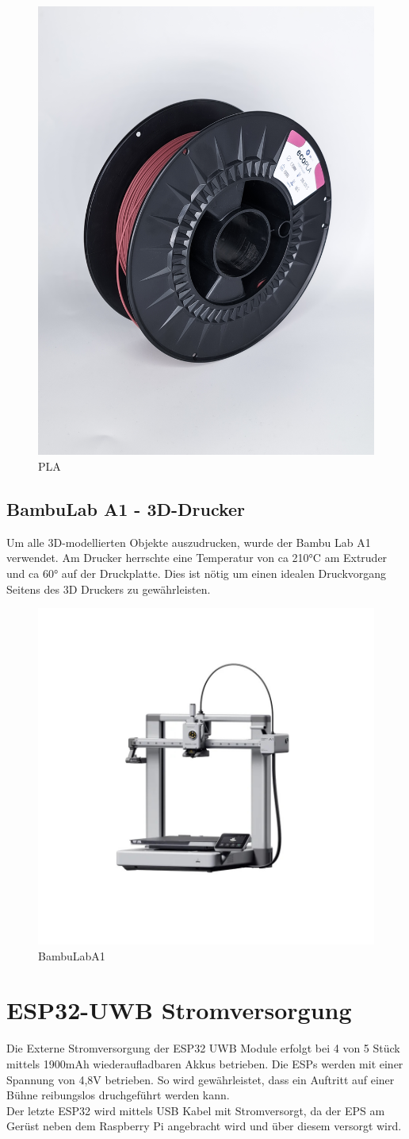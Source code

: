 \begin{figure}[H]
	\centering
	\includegraphics[width=0.3\linewidth]{images/PLA.jpg}
	\caption[PLA]{PLA}
	\label{fig:PLA} 
\end{figure}


\subsection{BambuLab A1 - 3D-Drucker}
Um alle 3D-modellierten Objekte auszudrucken, wurde der Bambu Lab A1 verwendet. Am Drucker herrschte eine Temperatur von ca 210°C am Extruder und ca 60° auf der Druckplatte. Dies ist nötig um einen idealen Druckvorgang Seitens des 3D Druckers zu gewährleisten.
\begin{figure}[H]
	\centering
	\includegraphics[width=0.5\linewidth]{images/BambuLabA1.jpg}
	\caption[BambuLabA1]{BambuLabA1}
	\label{fig: BambuLabA1}
\end{figure}

\section{ESP32-UWB Stromversorgung}
Die Externe Stromversorgung der ESP32 UWB Module erfolgt bei 4 von 5 Stück mittels 1900mAh wiederaufladbaren Akkus betrieben. Die ESPs werden mit einer Spannung von 4,8V betrieben. So wird gewährleistet, dass ein Auftritt auf einer Bühne reibungslos druchgeführt werden kann.\\
Der letzte ESP32 wird mittels USB Kabel mit Stromversorgt, da der EPS am Gerüst neben dem Raspberry Pi angebracht wird und über diesem versorgt wird.\\

